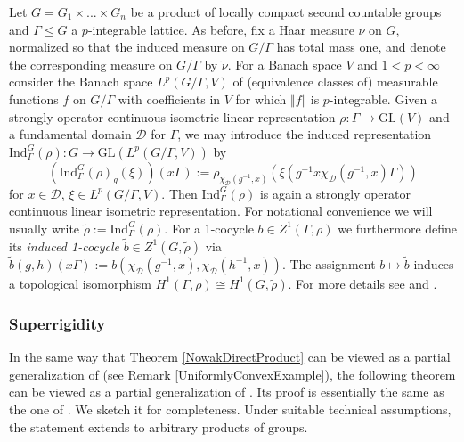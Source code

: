\documentclass[a4paper,11pt,reqno]{amsart}
\numberwithin{equation}{section}
\theoremstyle{definition}
\theoremstyle{remark}
\theoremstyle{remark}
\begin{document}
Let $G=G_{1}\times...\times G_{n}$ be a product of locally compact second countable groups and $\Gamma\leq G$ a $p$-integrable lattice. As before, fix a Haar measure $\nu$ on $G$, normalized so that the induced measure on $G/\Gamma$ has total mass one, and denote the corresponding measure on $G/\Gamma$ by $\widetilde{\nu}$. For a Banach space $V$ and $1<p<\infty$ consider the Banach space $L^{p}(G/\Gamma,V)$ of (equivalence classes of) measurable functions $f$ on $G/\Gamma$ with coefficients in $V$ for which $\Vert f\Vert$ is $p$-integrable. Given a strongly operator continuous isometric linear representation $\rho:\Gamma\rightarrow\text{GL}(V)$ and a fundamental domain $\mathcal{D}$ for $\Gamma$, we may introduce the induced representation $\text{Ind}_{\Gamma}^{G}(\rho):G\rightarrow\text{GL}(L^{p}(G/\Gamma,V))$ by 
\[
\left(\text{Ind}_{\Gamma}^{G}(\rho)_{g}(\xi)\right)(x\Gamma):=\rho_{\chi_{\mathcal{D}}(g^{-1},x)}\left(\xi\left(g^{-1}x\chi_{\mathcal{D}}(g^{-1},x)\Gamma\right)\right)
\]
for $x\in\mathcal{D}$, $\xi\in L^{p}(G/\Gamma,V)$. Then $\text{Ind}_{\Gamma}^{G}(\rho)$ is again a strongly operator continuous linear isometric representation. For notational convenience we will usually write $\widetilde{\rho}:=\text{Ind}_{\Gamma}^{G}(\rho)$. For a 1-cocycle $b\in Z^{1}(\Gamma,\rho)$ we furthermore define its \emph{induced 1-cocycle} $\widetilde{b}\in Z^{1}(G,\widetilde{\rho})$ via $\widetilde{b}(g,h)(x\Gamma):=b\left(\chi_{\mathcal{D}}(g^{-1},x),\chi_{\mathcal{D}}(h^{-1},x)\right)$. The assignment $b\mapsto\widetilde{b}$ induces a topological isomorphism $H^{1}(\Gamma,\rho)\cong H^{1}(G,\widetilde{\rho})$. For more details see \cite{Shalom00} and \cite{BaderFurmanGelanderMonod}.

\vspace{3mm}


\subsubsection{Superrigidity}

In the same way that Theorem \ref{NowakDirectProduct} can be viewed as a partial generalization of \cite[Theorem C]{BaderFurmanGelanderMonod} (see Remark \ref{UniformlyConvexExample}), the following theorem can be viewed as a partial generalization of \cite[Theorem D]{BaderFurmanGelanderMonod}. Its proof is essentially the same as the one of \cite[Theorem 4.1]{Shalom00}. We sketch it for completeness. Under suitable technical assumptions, the statement extends to arbitrary products of groups.
\end{document}
